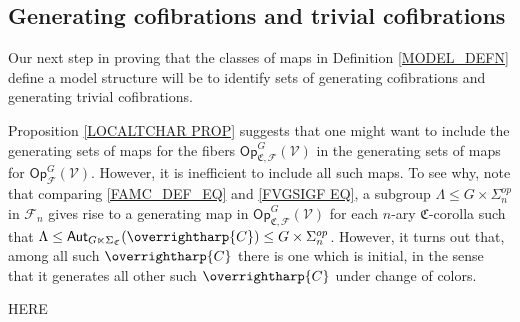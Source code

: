 \documentclass[a4paper,10pt
,draft
]{article}%
\numberwithin{equation}{section}
\numberwithin{figure}{section}
\theoremstyle{definition} %
\newcommand{\vect}[1]{\text{\overrightharp{\ensuremath{#1}}}}
\newcommand{\F}{\ensuremath{\mathcal F}}
\newcommand{\V}{\ensuremath{\mathcal V}}
\newcommand{\1}{\ensuremath{\mathbbm 1}}%
\begin{document}
\subsection{Generating cofibrations and trivial cofibrations}
\label{GENCOF SEC}

Our next step in proving that the classes of maps in Definition \ref{MODEL_DEFN}
define a model structure will be to identify sets of generating cofibrations and generating trivial cofibrations.

Proposition \ref{LOCALTCHAR PROP} suggests that one might want to include the generating sets of maps for the fibers 
$\mathsf{Op}^G_{\mathfrak{C},\F}(\V)$
in the generating sets of maps for 
$\mathsf{Op}^G_{\F}(\V)$.
However, it is inefficient to include all such maps.
To see why, note that comparing
\eqref{FAMC_DEF_EQ} and \eqref{FVGSIGF EQ},
a subgroup
$\Lambda \leq G \times \Sigma_n^{op}$ in $\F_n$
gives rise to a generating map in
$\mathsf{Op}^G_{\mathfrak{C},\F}(\V)$
for each $n$-ary $\mathfrak{C}$-corolla such that
$\Lambda \leq \mathsf{Aut}_{G\ltimes \Sigma_{\mathfrak{C}}}(\vect{C})
\leq G \times \Sigma_n^{op}$.
However, it turns out that, among all such $\vect{C}$ there is one which is initial, in the sense that it generates all other such 
$\vect{C}$ under change of colors.



{\color{blue} HERE}
\end{document}
